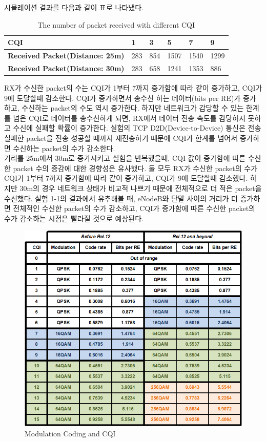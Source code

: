         시뮬레이션 결과를 다음과 같이 표로 나타냈다.\\
        
        \vspace{-3mm}
        \begin{table}[h!]
        \centering
            \begin{tabular}{|l|l|l|l|l|l|}
            \hline
            \textbf{CQI} & 1 & 3 & 5 & 7 & 9 \\
            \hline
            \multicolumn{1}{|c|}{\textbf{Received Packet(Distance: 25m)}} & \multicolumn{1}{|c|}{283} & 854 & 1507 & 1540 & 1299 \\
            \hline
            \multicolumn{1}{|c|}{\textbf{Received Packet(Distance: 30m)}} & \multicolumn{1}{|c|}{283} & 658 & 1241 & 1353 & 886 \\
            \hline
            \end{tabular}
            \caption{The number of packet received with different CQI}
        \end{table}
        \vspace{-3mm}
        RX가 수신한 packet의 수는 CQI가 1부터 7까지 증가함에 따라 같이 증가하고, CQI가 9에 도달할때 감소한다. CQI가 증가하면서 송수신 하는 데이터(bits per RE)가 증가하고, 수신하는 packet의 수도 역시 증가한다. 하지만 네트워크가 감당할 수 있는 한계를 넘은 CQI로 데이터를 송수신하게 되면, RX에서 데이터 전송 속도를 감당하지 못하고 수신에 실패할 확률이 증가한다. 실험의 TCP D2D(Device-to-Device) 통신은 전송 실패한 packet을 전송 성공할 때까지 재전송하기 때문에 CQI가 한계를 넘어서 증가하면 수신하는 packet의 수가 감소한다. \\
        거리를 25m에서 30m로 증가시키고 실험을 반복했을때, CQI 값이 증가함에 따른 수신한 packet 수의 증감에 대한 경향성은 유사했다. 둘 모두 RX가 수신한 packet의 수가 CQI가 1부터 7까지 증가함에 따라 같이 증가하고, CQI가 9에 도달할때 감소헸다. 하지만 30m의 경우 네트워크 상태가 비교적 나쁘기 때문에 전체적으로 더 적은 packet을 수신했다. 실험 1-1의 결과에서 유추해볼 때, eNodeB와 단말 사이의 거리가 더 증가하면 전체적인 수신한 packet의 수가 감소하고, CQI가 증가함에 따른 수신한 packet의 수가 감소하는 시점은 빨라질 것으로 예상된다.
        \begin{figure}[!h]\centering 
	        \includegraphics[width=.68\textwidth]{image/week11/1-2-11.png}
	        \caption{\footnotesize
	        Modulation Coding and CQI}
	        \vspace{-10pt}
        \end{figure}